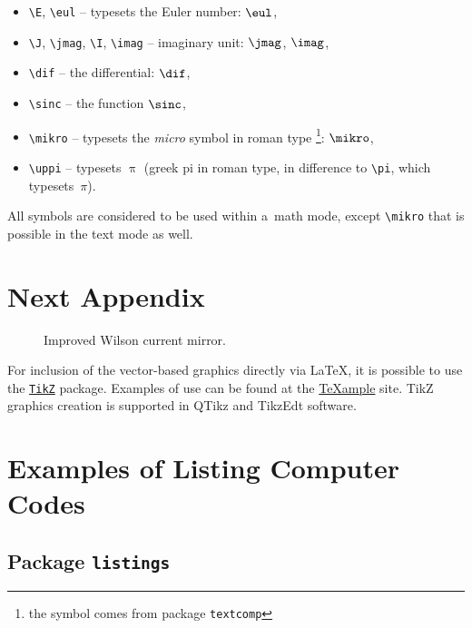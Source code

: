 \begin{itemize}
  \item
    \verb|\E|, \verb|\eul| -- typesets the Euler number: $\eul$,
  \item
    \verb|\J|, \verb|\jmag|, \verb|\I|, \verb|\imag| -- imaginary unit: $\jmag$, $\imag$,
  \item
    \verb|\dif| -- the differential: $\dif$,
  \item
    \verb|\sinc| -- the function $\sinc$,
  \item
    \verb|\mikro| -- typesets the \emph{micro} symbol in roman type%
			\footnote{the symbol comes from package \texttt{textcomp}}: $\mikro$,
	\item
		\verb|\uppi| -- typesets $\uppi$
			(greek pi in roman type, in difference to \verb|\pi|, which typesets~$\pi$).
\end{itemize}
%
All symbols are considered to be used within a~math mode, except \verb|\mikro| that is possible in the text mode as well.


\chapter{Next Appendix}

\begin{figure}[!h]
  \begin{center}
  \end{center}
  \caption[Wilson mirror]{Improved Wilson current mirror.}
\end{figure}

For inclusion of the vector-based graphics directly via \LaTeX, it is possible to use the \href{https://www.ctan.org/pkg/pgf}{\texttt{TikZ}} package.
Examples of use can be found at the \href{http://www.texample.net/tikz/examples/}{\TeX{}ample} site.
TikZ graphics creation is supported in QTikz and TikzEdt software.




\chapter{Examples of Listing Computer Codes}

\section{Package \texttt{listings}}

